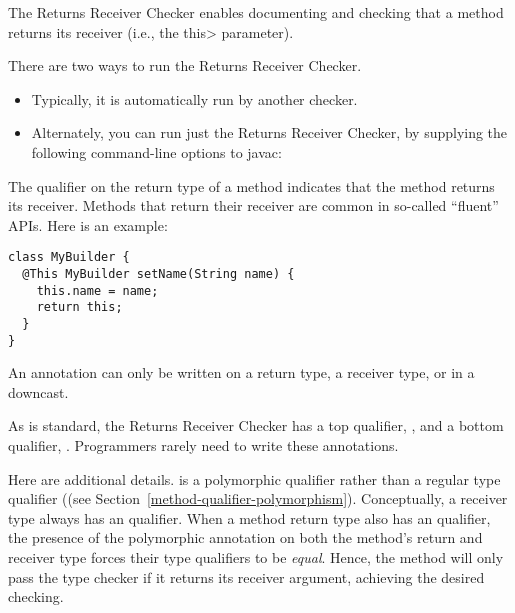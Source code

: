 \htmlhr
{}

The Returns Receiver Checker enables documenting and checking that a method
returns its receiver (i.e., the \<this> parameter).

There are two ways to run the Returns Receiver Checker.
\begin{itemize}
\item
Typically, it is automatically run by another checker.
\item
Alternately, you can run just the Returns Receiver Checker, by
supplying the following command-line options to javac:
\end{itemize}



The qualifier  on the return
type of a method indicates that the method returns its receiver.  Methods
that return their receiver are common in so-called ``fluent'' APIs.  Here
is an example:

\begin{Verbatim}
class MyBuilder {
  @This MyBuilder setName(String name) {
    this.name = name;
    return this;
  }
}
\end{Verbatim}

An  annotation can only be
written on a return type, a receiver type, or in a downcast.

As is standard, the Returns Receiver Checker has a top qualifier,
, and a bottom qualifier,
.
Programmers rarely need to write these annotations.

Here are additional details.  
is a polymorphic qualifier rather than a regular type qualifier ((see
Section~\ref{method-qualifier-polymorphism}). Conceptually, a receiver type always has
an  qualifier. When a method
return type also has an 
qualifier, the presence of the polymorphic annotation on both the method's
return and receiver type forces their type qualifiers to be \emph{equal}. Hence,
the method will only pass the type checker if it returns its receiver argument,
achieving the desired checking.


